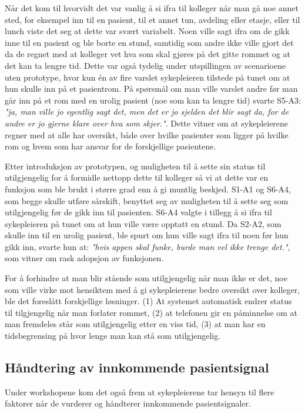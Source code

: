 \noindent
Når det kom til hvorvidt det var vanlig å si ifra til kolleger når man gå noe annet sted, for eksempel inn til en pasient, til et annet tun, avdeling eller etasje, eller til lunch viste det seg at dette var svært variabelt. Noen ville sagt ifra om de gikk inne til en pasient og ble borte en stund, samtidig som andre ikke ville gjort det da de regnet med at kolleger vet hva som skal gjøres på det gitte rommet og at det kan ta lengre tid.
Dette var også tydelig under utspillingen av scenarioene uten prototype, hvor kun én av fire varslet sykepleieren tilstede på tunet om at hun skulle inn på et pasientrom. På spørsmål om man ville varslet andre før man går inn på et rom med en urolig pasient (noe som kan ta lengre tid) svarte S5-A3: \emph{"ja, man ville jo egentlig sagt det, men det er jo sjelden det blir sagt da, for de andre er jo gjerne klare over hva som skjer."}. Dette vitner om at sykepleierene regner med at alle har oversikt, både over hvilke pasienter som ligger på hvilke rom og hvem som har ansvar for de forskjellige pasientene.

\noindent
Etter introduksjon av prototypen, og muligheten til å sette sin status til  utilgjengelig for å formidle nettopp dette til kolleger så vi at dette var en funksjon som ble brukt i større grad enn å gi muntlig beskjed.
S1-A1 og S6-A4, som begge skulle utføre sårskift, benyttet seg av muligheten til å sette seg som utilgjengelig før de gikk inn til pasienten. S6-A4 valgte i tillegg å si ifra til sykepleieren på tunet om at hun ville være opptatt en stund. Da S2-A2, som skulle inn til en urolig pasient, ble spurt om hun ville sagt ifra til noen før hun gikk inn, svarte hun at: \emph{"hvis appen skal funke, burde man vel ikke trenge det."}, som vitner om rask adopsjon av funksjonen.

\noindent
For å forhindre at man blir stående som utilgjengelig når man ikke er det, noe som ville virke mot hensiktem med å gi sykepleierene bedre oversikt over kolleger, ble det foreslått forskjellige løsninger. (1) At systemet automatisk endrer status til tilgjengelig når man forlater rommet, (2) at telefonen gir en påminnelse om at man fremdeles står som utilgjengelig etter en viss tid, (3) at man har en tidsbegrensing på hvor lenge man kan stå som utilgjengelig.


\subsection{Håndtering av innkommende pasientsignal}
Under workshopene kom det også frem at sykepleierene tar hensyn til flere faktorer når de vurderer og håndterer innkommende pasientsignaler. 


